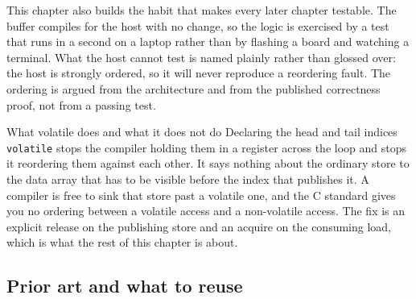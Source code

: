 This chapter also builds the habit that makes every later chapter testable. The
buffer compiles for the host with no change, so the logic is exercised by a test
that runs in a second on a laptop rather than by flashing a board and watching a
terminal. What the host cannot test is named plainly rather than glossed over:
the host is strongly ordered, so it will never reproduce a reordering fault. The
ordering is argued from the architecture and from the published correctness
proof, not from a passing test.

\begin{note}{What volatile does and what it does not do}
Declaring the head and tail indices \texttt{volatile} stops the compiler holding
them in a register across the loop and stops it reordering them against each
other. It says nothing about the ordinary store to the data array that has to be
visible before the index that publishes it. A compiler is free to sink that
store past a volatile one, and the C standard gives you no ordering between a
volatile access and a non-volatile access. The fix is an explicit release on the
publishing store and an acquire on the consuming load, which is what the rest of
this chapter is about.
\end{note}

\subsection*{Prior art and what to reuse}

